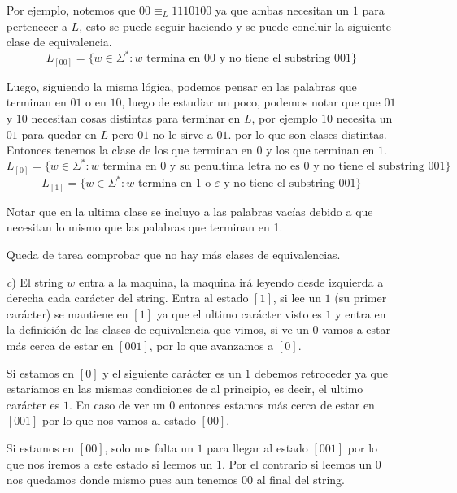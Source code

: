 \documentclass[letterpaper,11pt]{article}
\theoremstyle{plain}
\begin{document}
\begin{framed}
\begin{enumerate}
                Por ejemplo, notemos que $00 \equiv_L 1110100$ ya que ambas necesitan un $1$ para pertenecer a $L$, esto se puede seguir haciendo y se puede concluir la siguiente clase de equivalencia.
                    $$L_{[00]}=\{ w\in \Sigma^* : w \text{ termina en } 00 \text{ y no tiene el substring } 001\}$$
                    
                Luego, siguiendo la misma lógica, podemos pensar en las palabras que terminan en $01$ o en $10$, luego de estudiar un poco, podemos notar que que $01$ y $10$ necesitan cosas distintas para terminar en $L$, por ejemplo $10$ necesita un $01$ para quedar en $L$ pero $01$ no le sirve a $01$. por lo que son clases distintas. Entonces tenemos la clase de los que terminan en $0$ y los que terminan en $1$.
                    $$L_{[0]}= \{ w\in \Sigma^* : w \text{ termina en } 0 \text{ y su penultima letra no es }0 \text{ y no tiene el substring } 001\}$$
                    $$L_{[1]}= \{ w\in \Sigma^* : w \text{ termina en } 1 \text{ o } \varepsilon  \text{ y no tiene el substring } 001\}$$
                
                Notar que en la ultima clase se incluyo a las palabras vacías debido a que necesitan lo mismo que las palabras que terminan en 1.
                
                Queda de tarea comprobar que no hay más clases de equivalencias.
                
            \item[\textit{c})] El string $w$ entra a la maquina, la maquina irá leyendo desde izquierda a derecha cada carácter del string. Entra al estado $[1]$, si lee un $1$ (su primer carácter) se mantiene en $[1]$ ya que el ultimo carácter visto es $1$ y entra en la definición de las clases de equivalencia que vimos, si ve un $0$ vamos a estar más cerca de estar en $[001]$, por lo que avanzamos a $[0]$.
            
            Si estamos en $[0]$ y el siguiente carácter es un $1$ debemos retroceder ya que estaríamos en las mismas condiciones de al principio, es decir, el ultimo carácter es $1$. En caso de ver un $0$ entonces estamos más cerca de estar en $[001]$ por lo que nos vamos al estado $[00]$.
            
            Si estamos en $[00]$, solo nos falta un $1$ para llegar al estado $[001]$ por lo que nos iremos a este estado si leemos un $1$. Por el contrario si leemos un $0$ nos quedamos donde mismo pues aun tenemos $00$ al final del string.
            

\end{enumerate}
\end{framed}
\end{document}
